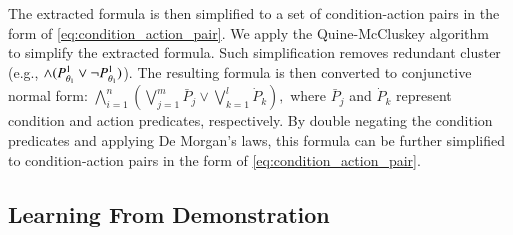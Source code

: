The extracted formula is then simplified to a set of condition-action pairs in the form of \eqref{eq:condition_action_pair}.
We apply the Quine-McCluskey algorithm~\cite{McCluskey1956MinimizationOB} to simplify the extracted formula.
Such simplification removes redundant cluster (e.g., $\land (P^{1}_{\theta_1} \lor \lnot P^{1}_{\theta_1})$).
The resulting formula is then converted to conjunctive normal form:
$
    \bigwedge_{i=1}^n \left( \bigvee_{j=1}^m \bar{P}_j \lor \bigvee_{k=1}^l \dot{P}_k \right),
$
where $\bar{P}_j$ and $\dot{P}_k$ represent condition and action predicates, respectively. By double negating the condition predicates and applying De Morgan's laws, this formula can be further simplified to condition-action pairs in the form of \eqref{eq:condition_action_pair}.


\subsection{Learning From Demonstration}
\label{sec:learning_from_single_class_demonstration}

